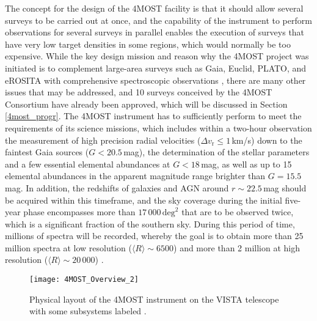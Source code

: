\documentclass[a4paper,11pt]{article}
\begin{document}
%
The concept for the design of the 4MOST facility is that it should allow several surveys to be carried out at once, and the capability of the instrument to perform observations for several surveys in parallel enables the execution of surveys that have very low target densities in some regions, which would normally be too expensive. While the key design mission and reason why the 4MOST project was initiated is to complement large-area surveys such as Gaia, Euclid, PLATO, and eROSITA with comprehensive spectroscopic observations \citep{4most12,4most14}, there are many other issues that may be addressed, and 10 surveys conceived by the 4MOST Consortium have already been approved, which will be discussed in Section \ref{4most_progr}. The 4MOST instrument has to sufficiently perform to meet the requirements of its science missions, which includes within a two-hour observation the measurement of high precision radial velocities ($\Delta v_\mathrm{r}\leq1$\,km/s) down to the faintest Gaia sources ($G<20.5$\,mag), the determination of the stellar parameters and a few essential elemental abundances at $G<18$\,mag, as well as up to 15 elemental abundances in the apparent magnitude range brighter than $G=15.5$\,mag. In addition, the redshifts of galaxies and AGN around $r\sim22.5$\,mag should be acquired within this timeframe, and the sky coverage during the initial five-year phase encompasses more than $17\,000\,\mathrm{deg}^2$ that are to be observed twice, which is a significant fraction of the southern sky. During this period of time, millions of spectra will be recorded, whereby the goal is to obtain more than 25 million spectra at low resolution ($\langle R\rangle\sim6500$) and more than 2 million at high resolution ($\langle R\rangle\sim20\,000$) \citep{4most16}.
%
\begin{figure}
 \centering
 \texttt{[image: 4MOST\_Overview\_2]}
 \caption[Physical layout of the 4MOST instrument]{Physical layout of the 4MOST instrument on the VISTA telescope with some subsystems labeled \citep{4most16}.}
 \label{fig:4most_whole}
\end{figure}\\ \\
%
\end{document}
